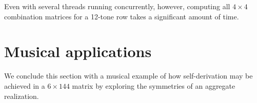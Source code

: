 Even with several threads running concurrently, however, computing all $4 \times 4$ combination matrices for a 12-tone row takes a significant amount of time.



\section{Musical applications}

We conclude this section with a musical example of how self-derivation may be achieved in a $6 \times 144$ matrix by exploring the symmetries of an aggregate realization.

